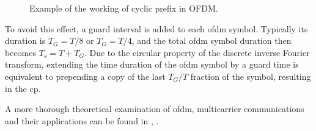 \begin{figure}[t]
	\centering
	
	\vspace{0.5cm}
	
	\caption[]{Example of the working of cyclic prefix in OFDM.}
	\label{fig:OFDM_cyclic prefix}
\end{figure}

To avoid this effect, a guard interval is added to each \gls{ofdm} symbol. Typically its duration is $T_G = T/8$ or $T_G = T/4$, and the total \gls{ofdm} symbol duration then becomes $T_s = T + T_G$.
Due to the circular property of the discrete inverse Fourier transform, extending the time duration of the \gls{ofdm} symbol by a guard time is equivalent to prepending a copy of the last $T_G/T$ fraction of the symbol, resulting in the \gls{cp}.


A more thorough theoretical examination of \gls{ofdm}, multicarrier communications and their applications can be found in \cite{OFDMWireless}, \cite{Proakis_2001}.


